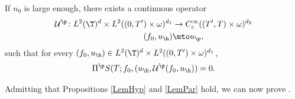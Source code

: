 \begin{prop}
\label{LemPar}
If $n_0$ is large enough, there exists a continuous operator
\begin{align*}
\mathcal U^\p \colon
L^2(\T)^{d} \times L^2((0,T')\times\omega)^{d_1} & \to C^\infty_c((T',T)\times\omega)^{d_2} \\
(f_0,u_{\h}) &\mto u_{\p},
\end{align*}
such that for every $(f_0,u_{\h})\in L^2(\T)^{d} \times L^2((0,T')\times\omega)^{d_1}$,
\begin{equation*}
\Pi^{\p} S(T;f_0, (u_{\h},\mathcal U^\p(f_0,u_{\h})) = 0.
\end{equation*}
\end{prop}

Admitting that Propositions \ref{LemHyp} and \ref{LemPar} hold, we can now prove .

